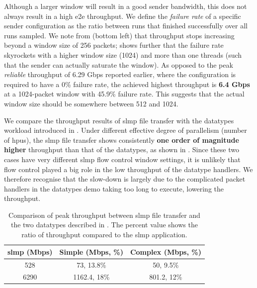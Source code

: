 Although a larger window will result in a good sender bandwidth, this does not always result in a high \ac{e2e} throughput.  We define the \emph{failure rate} of a specific sender configuration as the ratio between runs that finished successfully over all runs sampled.   We note from  (bottom left) that throughput stops increasing beyond a window size of 256 packets;  shows further that the failure rate skyrockets with a higher window size (1024) and more than one threads (such that the sender can actually saturate the window).  As opposed to the peak \emph{reliable} throughput of 6.29 Gbps reported earlier, where the configuration is required to have a 0\% failure rate, the achieved highest throughput is \textbf{6.4 Gbps} at a 1024-packet window with 45.9\% failure rate.  This suggests that the actual window size should be somewhere between 512 and 1024.

We compare the throughput results of \ac{slmp} file transfer with the datatypes workload introduced in .  Under different effective degree of parallelism (number of \ac{hpu}s), the \ac{slmp} file transfer shows consistently \textbf{one order of magnitude higher} throughput than that of the datatypes, as shown in .  Since these two cases have very different \ac{slmp} flow control window settings, it is unlikely that flow control played a big role in the low throughput of the datatype handlers.  We therefore recognise that the slow-down is largely due to the complicated packet handlers in the datatypes demo taking too long to execute, lowering the throughput.

\begin{table}[tp]
    \centering
    \begin{tabular}{ccc}
    \toprule
    \ac{slmp} (Mbps) & \textbf{Simple} (Mbps, \%) & \textbf{Complex} (Mbps, \%) \\ \midrule
      528   & 73, 13.8\% & 50, 9.5\% \\
      6290  & 1162.4, 18\% & 801.2, 12\% \\
      \bottomrule
    \end{tabular}
    \caption{Comparison of peak throughput between \ac{slmp} file transfer and the two datatypes described in .  The percent value shows the ratio of throughput compared to the \ac{slmp} application.} \label{tab:slmp-datatypes-compare}
\end{table}


